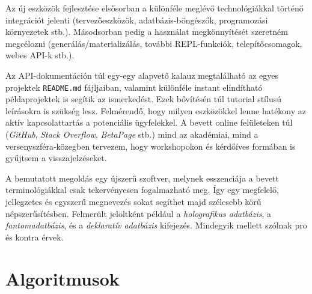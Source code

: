\documentclass[
    parspace,
    noindent,
    nohyp,
]{elteiktdk}[2023/04/10]
\begin{document}
Az új eszközök fejlesztése elsősorban a különféle meglévő technológiákkal történő integrációt jelenti
(tervezőeszközök, adatbázis-böngészők, programozási környezetek stb.).
Másodsorban pedig a használat megkönnyítését szeretném megcélozni
(generálás/materializálás, további REPL-funkciók, telepítőcsomagok, webes API-k stb.).

Az API-dokumentáción túl egy-egy alapvető kalauz megtalálható
az egyes projektek \texttt{README.md} fájljaiban,
valamint különféle instant elindítható példaprojektek is segítik az ismerkedést.
Ezek bővítésén túl tutorial stílusú leírásokra is szükség lesz.
Felmérendő, hogy milyen eszközökkel lenne hatékony az aktív kapcsolattartás a potenciális ügyfelekkel.
A bevett online felületeken túl (\textit{GitHub}, \textit{Stack Overflow}, \textit{BetaPage} stb.)
mind az akadémiai, mind a versenyszféra-közegben tervezem,
hogy workshopokon és kérdőíves formában is gyűjtsem a visszajelzéseket.

A bemutatott megoldás egy újszerű szoftver,
melynek esszenciája a bevett terminológiákkal csak tekervényesen fogalmazható meg.
Így egy megfelelő, jellegzetes és egyszerű megnevezés
sokat segíthet majd szélesebb körű népszerűsítésben.
Felmerült jelöltként például
a \textit{holografikus adatbázis},
a \textit{fantomadatbázis},
és a \textit{deklaratív adatbázis} kifejezés.
Mindegyik mellett szólnak pro és kontra érvek.

\pagebreak


{}
\printbibliography[title=\biblabel]
\cleardoublepage


\appendix

\chapter{Algoritmusok}

{}
\end{document}
